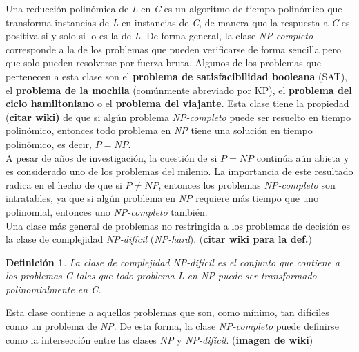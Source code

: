 \documentclass[a4paper, 12pt, oneside]{book}
\newtheorem{definicion}{Definici\'on}[chapter]
\begin{document}
	Una reducci\'on polin\'omica de \textit{L} en \textit{C} es un algoritmo de tiempo polin\'omico que transforma instancias de \textit{L} en instancias de \textit{C}, de manera que la respuesta a \textit{C} es positiva si y solo si lo es la de \textit{L}. De forma general, la clase \textit{NP-completo} corresponde a la de los problemas que pueden verificarse de forma sencilla pero que solo pueden resolverse por fuerza bruta. Algunos de los problemas que pertenecen a esta clase son el \textbf{problema de satisfacibilidad booleana} (SAT), el \textbf{problema de la mochila} (com\'unmente abreviado por KP), el \textbf{problema del ciclo hamiltoniano} o el \textbf{problema del viajante}. Esta clase tiene la propiedad (\textbf{citar wiki)} de que si alg\'un problema \textit{NP-completo} puede ser resuelto en tiempo polin\'omico, entonces todo problema en \textit{NP} tiene una soluci\'on en tiempo polin\'omico, es decir, $P = NP$.
	\\
	
	A pesar de a\~{n}os de investigaci\'on, la cuesti\'on de si $P = NP$ contin\'ua a\'un abieta y es considerado uno de los problemas del milenio. La importancia de este resultado radica en el hecho de que si $P \neq NP$, entonces los problemas \textit{NP-completo} son intratables, ya que si alg\'un problema en \textit{NP} requiere m\'as tiempo que uno polinomial, entonces uno \textit{NP-completo} tambi\'en.
	\\
	
	Una clase m\'as general de problemas no restringida a los problemas de decisi\'on es la clase de complejidad \textit{NP-dif\'icil} (\textit{NP-hard}). (\textbf{citar wiki para la def.})
	
	\begin{definicion}
		La clase de complejidad NP-dif\'icil es el conjunto que contiene a los problemas C tales que todo problema L en NP puede ser transformado polinomialmente en C.
	\end{definicion}
	
	Esta clase contiene a aquellos problemas que son, como m\'inimo, tan dif\'iciles como un problema de \textit{NP}. De esta forma, la clase \textit{NP-completo} puede definirse como la intersecci\'on entre las clases \textit{NP} y \textit{NP-dif\'icil}. (\textbf{imagen de wiki})
	
\end{document}
